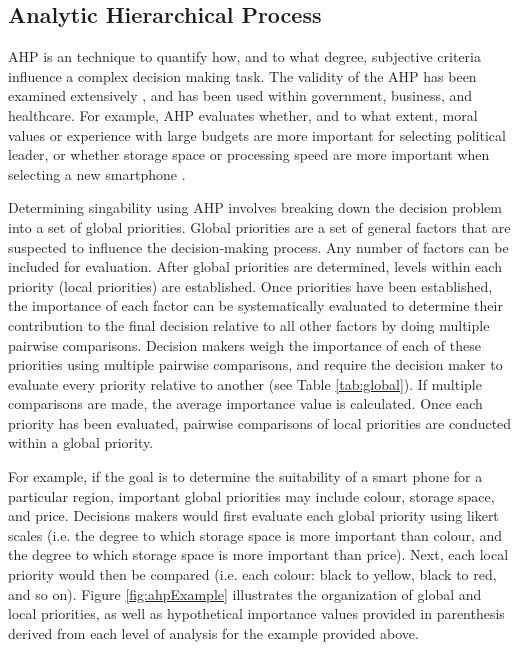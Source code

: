 
\subsection{Analytic Hierarchical Process}\label{sec:ahp}
AHP is an technique to quantify how, and to what degree, subjective criteria influence a complex decision making task. The validity of the AHP has been examined extensively \cite{vaidya2006analytic}, and has been used within government, business, and healthcare. For example, AHP evaluates whether, and to what extent, moral values or experience with large budgets are more important for selecting political leader, or whether storage space or processing speed are more important when selecting a new smartphone \cite{tuarob2015quantifying}.

Determining singability using AHP involves breaking down the decision problem into a set of global priorities. Global priorities are a set of general factors that are suspected to influence the decision-making process. Any number of factors can be included for evaluation. After global priorities are determined, levels within each priority (local priorities) are established. Once priorities have been established, the importance of each factor can be systematically evaluated to determine their contribution to the final decision relative to all other factors by doing multiple pairwise comparisons. Decision makers weigh the importance of each of these priorities using multiple pairwise comparisons, and require the decision maker to evaluate every priority relative to another (see Table \ref{tab:global}). If multiple comparisons are made, the average importance value is calculated. Once each priority has been evaluated, pairwise comparisons of local priorities are conducted within a global priority.

For example, if the goal is to determine the suitability of a smart phone for a particular region, important global priorities may include colour, storage space, and price. Decisions makers would first evaluate each global priority using likert scales (i.e. the degree to which storage space is more important than colour, and the degree to which storage space is more important than price). Next, each local priority would then be compared  (i.e. each colour: black to yellow, black to red, and so on). Figure \ref{fig:ahpExample} illustrates the organization of global and local priorities, as well as hypothetical importance values provided in parenthesis derived from each level of analysis for the example provided above.

